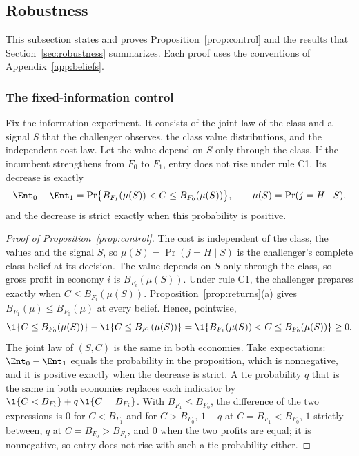 \subsection{Robustness}\label{app:robustness}

This subsection states and proves Proposition~\ref{prop:control} and the results that Section~\ref{sec:robustness}
summarizes. Each proof uses the conventions of Appendix~\ref{app:beliefs}.

\subsubsection*{The fixed-information control}

\begin{proposition}\label{prop:control}
Fix the information experiment. It consists of the joint law of the class and a signal \(S\) that the challenger
observes, the class value distributions, and the independent cost law. Let the value depend on \(S\) only through the class. If
the incumbent strengthens from \(F_0\) to \(F_1\), entry does not rise under rule C1. Its decrease is exactly
\[
\Ent_0-\Ent_1=\Pr\bigl\{B_{F_1}(\mu(S))<C\le B_{F_0}(\mu(S))\bigr\},\qquad \mu(S)=\Pr(j=H\mid S),
\]
and the decrease is strict exactly when this probability is positive.
\end{proposition}

\begin{proof}[Proof of Proposition~\ref{prop:control}]
The cost is independent of the class, the values and the signal \(S\), so \(\mu(S)=\Pr(j=H\mid S)\) is the
challenger's complete class belief at its decision. The value depends on \(S\) only through the class, so gross
profit in economy \(i\) is \(B_{F_i}(\mu(S))\). Under rule C1, the challenger prepares exactly when
\(C\le B_{F_i}(\mu(S))\). Proposition~\ref{prop:returns}(a) gives \(B_{F_1}(\mu)\le B_{F_0}(\mu)\) at every belief.
Hence, pointwise,
\[
\1\{C\le B_{F_0}(\mu(S))\}-\1\{C\le B_{F_1}(\mu(S))\}=\1\{B_{F_1}(\mu(S))<C\le B_{F_0}(\mu(S))\}\ge0 .
\]
The joint law of \((S,C)\) is the same in both economies. Take expectations: \(\Ent_0-\Ent_1\) equals the
probability in the proposition, which is nonnegative, and it is positive exactly when the decrease is strict. A
tie probability \(q\) that is the same in both economies replaces each indicator by
\(\1\{C<B_{F_i}\}+q\,\1\{C=B_{F_i}\}\). With \(B_{F_1}\le B_{F_0}\), the difference of the two expressions is \(0\) for
\(C<B_{F_1}\) and for \(C>B_{F_0}\), \(1-q\) at \(C=B_{F_1}<B_{F_0}\), \(1\) strictly between, \(q\) at \(C=B_{F_0}>B_{F_1}\),
and \(0\) when the two profits are equal; it is nonnegative, so entry does not rise with such a tie probability
either.
\end{proof}

